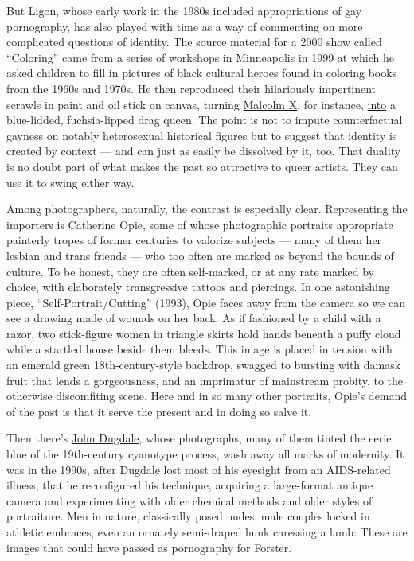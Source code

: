 But Ligon, whose early work in the 1980s included appropriations of gay
pornography, has also played with time as a way of commenting on more
complicated questions of identity. The source material for a 2000 show
called ``Coloring'' came from a series of workshops in Minneapolis in
1999 at which he asked children to fill in pictures of black cultural
heroes found in coloring books from the 1960s and 1970s. He then
reproduced their hilariously impertinent scrawls in paint and oil stick
on canvas, turning
\href{https://www.nytimes3xbfgragh.onion/topic/person/malcolm-x}{Malcolm
X}, for instance,
\href{https://www.whitney.org/WatchAndListen/728}{into} a blue-lidded,
fuchsia-lipped drag queen. The point is not to impute counterfactual
gayness on notably heterosexual historical figures but to suggest that
identity is created by context --- and can just as easily be dissolved
by it, too. That duality is no doubt part of what makes the past so
attractive to queer artists. They can use it to swing either way.

Among photographers, naturally, the contrast is especially clear.
Representing the importers is Catherine Opie, some of whose photographic
portraits appropriate painterly tropes of former centuries to valorize
subjects --- many of them her lesbian and trans friends --- who too
often are marked as beyond the bounds of culture. To be honest, they are
often self-marked, or at any rate marked by choice, with elaborately
transgressive tattoos and piercings. In one astonishing piece,
``Self-Portrait/Cutting'' (1993), Opie faces away from the camera so we
can see a drawing made of wounds on her back. As if fashioned by a child
with a razor, two stick-figure women in triangle skirts hold hands
beneath a puffy cloud while a startled house beside them bleeds. This
image is placed in tension with an emerald green 18th-century-style
backdrop, swagged to bursting with damask fruit that lends a
gorgeousness, and an imprimatur of mainstream probity, to the otherwise
discomfiting scene. Here and in so many other portraits, Opie's demand
of the past is that it serve the present and in doing so salve it.

Then there's \href{http://johndugdalestudio.com/}{John Dugdale}, whose
photographs, many of them tinted the eerie blue of the 19th-century
cyanotype process, wash away all marks of modernity. It was in the
1990s, after Dugdale lost most of his eyesight from an AIDS-related
illness, that he reconfigured his technique, acquiring a large-format
antique camera and experimenting with older chemical methods and older
styles of portraiture. Men in nature, classically posed nudes, male
couples locked in athletic embraces, even an ornately semi-draped hunk
caressing a lamb: These are images that could have passed as pornography
for Forster.

